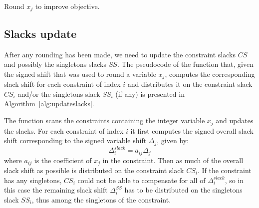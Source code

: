 \documentclass[a4paper,12pt]{book}
\begin{document}
\begin{algorithm}[ht]

	\caption{Round $x_j$ to improve objective.}
	\label{alg:roundxjbestobj}
\end{algorithm}

\subsection{Slacks update}
After any rounding has been made, we need to update the constraint slacks $CS$ and possibly the singletons slacks $SS$. The pseudocode of the function that, given the signed shift that was used to round a variable $x_j$, computes the corresponding slack shift for each constraint of index $i$ and distributes it on the constraint slack $CS_i$ and/or the singletons slack $SS_i$ (if any) is presented in Algorithm~\ref{alg:updateslacks}. \par
The function scans the constraints containing the integer variable $x_j$ and updates the slacks. For each constraint of index $i$ it first computes the signed overall slack shift corresponding to the signed variable shift $\Delta_{j}$, given by:
\begin{equation}
	\Delta_{i}^{slack} = a_{ij} \Delta_{j}
\end{equation}
where $a_{ij}$ is the coefficient of $x_j$ in the constraint. Then as much of the overall slack shift as possible is distributed on the constraint slack $CS_i$. If the constraint has any singletons, $CS_i$ could not be able to compensate for all of $\Delta_{i}^{slack}$, so in this case the remaining slack shift $\Delta_{i}^{SS}$ has to be distributed on the singletons slack $SS_i$, thus among the singletons of the constraint. \par
\end{document}
